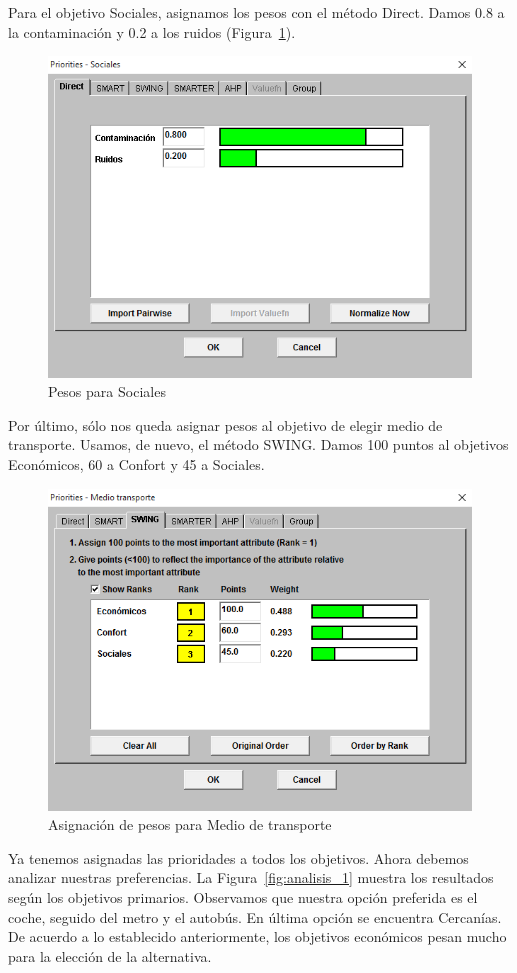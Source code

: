 \documentclass[12pt,a4paper,twoside,openright,titlepage,final]{article}
\begin{document}
Para el objetivo Sociales, asignamos los pesos con el método Direct. Damos 0.8 a la contaminación y 0.2 a los ruidos (Figura~\ref{fig:prioridades_sociales}).\\

\begin{figure}[htbp!]
\centering
\includegraphics[width=0.5\linewidth]{imagenes/prioridades_sociales}
\caption{Pesos para Sociales} \label{fig:prioridades_sociales}
\end{figure}

Por último, sólo nos queda asignar pesos al objetivo de elegir medio de transporte. Usamos, de nuevo, el método SWING. Damos 100 puntos al objetivos Económicos, 60 a Confort y 45 a Sociales.\\

\begin{figure}[htbp!]
\centering
\includegraphics[width=0.5\linewidth]{imagenes/prioridades_medio_transporte}
\caption{Asignación de pesos para Medio de transporte} \label{fig:prioridades_medio_transporte}
\end{figure}

Ya tenemos asignadas las prioridades a todos los objetivos. Ahora debemos analizar nuestras preferencias. La Figura~\ref{fig:analisis_1} muestra los resultados según los objetivos primarios. Observamos que nuestra opción preferida es el coche, seguido del metro y el autobús. En última opción se encuentra Cercanías. De acuerdo a lo establecido anteriormente, los objetivos económicos pesan mucho para la elección de la alternativa.\\
\end{document}
